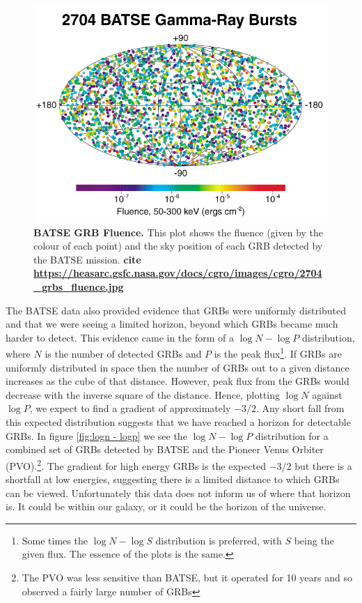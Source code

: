 \documentclass[11pt]{cuthesis}
\begin{document}
\begin{figure} %
\begin{center}
\includegraphics[width=0.8\linewidth]{batse_grbs_fluence.jpg}
\end{center}
\caption{\textbf{BATSE GRB Fluence.} This plot shows the fluence (given by the colour of each point) and the sky position of each GRB detected by the BATSE mission. \textbf{cite \url{https://heasarc.gsfc.nasa.gov/docs/cgro/images/cgro/2704_grbs_fluence.jpg}}}
\label{fig:batse grb fluence}
\end{figure}

The BATSE data also provided evidence that GRBs were uniformly distributed and that we were seeing a limited horizon, beyond which GRBs became much harder to detect. This evidence came in the form of a $\log N - \log P$ distribution, where $N$ is the number of detected GRBs and $P$ is the peak flux\footnote{Some times the $\log N - \log S$ distribution is preferred, with $S$ being the given flux. The essence of the plots is the same.}. If GRBs are uniformly distributed in space then the number of GRBs out to a given distance increases as the cube of that distance. However, peak flux from the GRBs would decrease with the inverse square of the distance. Hence, plotting  $\log N$ against $\log P$, we expect to find a gradient of approximately $-3/2$. Any short fall from this expected distribution suggests that we have reached a horizon for detectable GRBs. In figure \ref{fig:logn - logp} we see the $\log N - \log P$ distribution for a combined set of GRBs detected by BATSE and the Pioneer Venus Orbiter (PVO).\footnote{ The PVO was less sensitive than BATSE, but it operated for 10 years and so observed a fairly large number of GRBs}. The gradient for high energy GRBs is the expected $-3/2$ but there is a shortfall at low energies, suggesting there is a limited distance to which GRBs can be viewed. Unfortunately this data does not inform us of where that horizon is. It could be within our galaxy, or it could be the horizon of the universe.   
\end{document}
